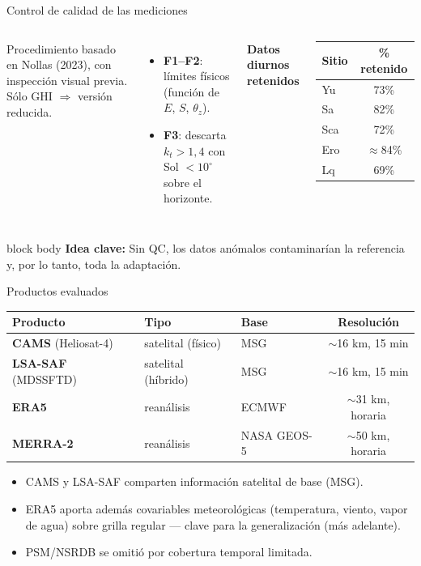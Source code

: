\documentclass[aspectratio=169,11pt]{beamer}
\newcommand{\clave}[1]{%
  \begin{beamercolorbox}[wd=\linewidth,sep=6pt,rounded=true]{block body}%
    \footnotesize\textbf{\color{primary}Idea clave: }#1%
  \end{beamercolorbox}}
\begin{document}
\begin{frame}{Control de calidad de las mediciones}
  \footnotesize
  \begin{columns}[T]
    Procedimiento basado en Nollas (2023), con inspección visual previa. Sólo GHI $\Rightarrow$ versión reducida.
    \begin{itemize}
      \item \textbf{F1–F2}: límites físicos (función de $E$, $S$, $\theta_z$).
      \item \textbf{F3}: descarta $k_t>1{,}4$ con Sol $<10^\circ$ sobre el horizonte.
    \end{itemize}
    \textbf{Datos diurnos retenidos}
    \begin{tabular}{@{}lc@{}}
      \toprule
      Sitio & \% retenido\\
      \midrule
      Yu  & 73\%\\
      Sa  & 82\%\\
      Sca & 72\%\\
      Ero & $\approx$84\%\\
      Lq  & 69\%\\
      \bottomrule
    \end{tabular}
  \end{columns}
  \vspace{0.3em}
  \clave{Sin QC, los datos anómalos contaminarían la referencia y, por lo tanto, toda la adaptación.}
\end{frame}

\begin{frame}{Productos evaluados}
  \scriptsize
  \renewcommand{\arraystretch}{1.25}
  \begin{tabular}{@{}lllc@{}}
    \toprule
    \textbf{Producto} & \textbf{Tipo} & \textbf{Base} & \textbf{Resolución}\\
    \midrule
    \textbf{CAMS} (Heliosat-4) & satelital (físico) & MSG  & $\sim$16 km, 15 min\\
    \textbf{LSA-SAF} (MDSSFTD) & satelital (híbrido) & MSG & $\sim$16 km, 15 min\\
    \textbf{ERA5} & reanálisis & ECMWF & $\sim$31 km, horaria\\
    \textbf{MERRA-2} & reanálisis & NASA GEOS-5 & $\sim$50 km, horaria\\
    \bottomrule
  \end{tabular}
  \vspace{0.5em}
  \begin{itemize}
    \item CAMS y LSA-SAF comparten información satelital de base (MSG).
    \item ERA5 aporta además covariables meteorológicas (temperatura, viento, vapor de agua) sobre grilla regular — clave para la generalización (más adelante).
    \item PSM/NSRDB se omitió por cobertura temporal limitada.
  \end{itemize}
\end{frame}
\end{document}
